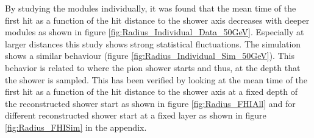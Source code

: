 \documentclass{JINST}
\begin{document}
By studying the modules individually, it was found that the mean time of the first hit as a function of the hit distance to the shower axis decreases with deeper modules as shown in figure \ref{fig:Radius_Individual_Data_50GeV}. Especially at larger distances this study shows strong statistical fluctuations. The simulation shows a similar behaviour (figure \ref{fig:Radius_Individual_Sim_50GeV}). This behavior is related to where the pion shower starts and thus, at the depth that the shower is sampled. This has been verified by looking at the mean time of the first hit as a function of the hit distance to the shower axis at a fixed depth of the reconstructed shower start as shown in figure \ref{fig:Radius_FHIAll} and for different reconstructed shower start at a fixed layer as shown in figure \ref{fig:Radius_FHISim} in the appendix.
\end{document}
